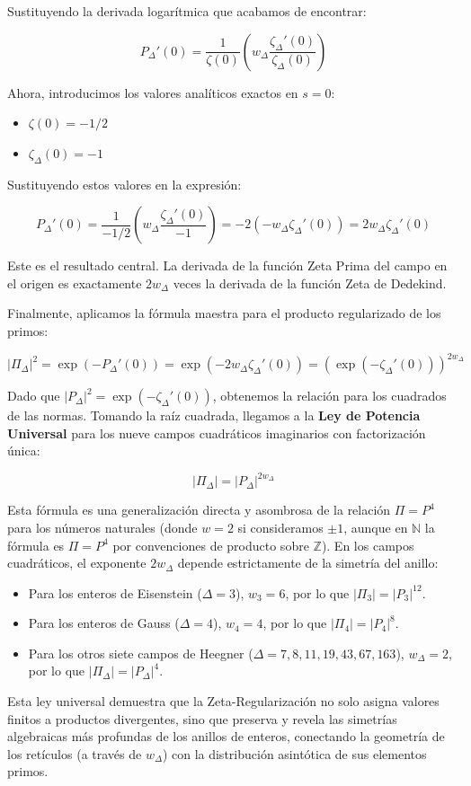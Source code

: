 Sustituyendo la derivada logarítmica que acabamos de encontrar:

$$ P_\Delta'(0) = \frac{1}{\zeta(0)} \left( w_\Delta \frac{\zeta_\Delta'(0)}{\zeta_\Delta(0)} \right) $$

Ahora, introducimos los valores analíticos exactos en $s=0$:
\begin{itemize}
    \item $\zeta(0) = -1/2$
    \item $\zeta_\Delta(0) = -1$
\end{itemize}

Sustituyendo estos valores en la expresión:

$$ P_\Delta'(0) = \frac{1}{-1/2} \left( w_\Delta \frac{\zeta_\Delta'(0)}{-1} \right) = -2 \left( -w_\Delta \zeta_\Delta'(0) \right) = 2w_\Delta \zeta_\Delta'(0) $$

Este es el resultado central. La derivada de la función Zeta Prima del campo en el origen es exactamente $2w_\Delta$ veces la derivada de la función Zeta de Dedekind. 

Finalmente, aplicamos la fórmula maestra para el producto regularizado de los primos:

$$ |\Pi_\Delta|^2 = \exp(-P_\Delta'(0)) = \exp(-2w_\Delta \zeta_\Delta'(0)) = \left( \exp(-\zeta_\Delta'(0)) \right)^{2w_\Delta} $$

Dado que $|P_\Delta|^2 = \exp(-\zeta_\Delta'(0))$, obtenemos la relación para los cuadrados de las normas. Tomando la raíz cuadrada, llegamos a la \textbf{Ley de Potencia Universal} para los nueve campos cuadráticos imaginarios con factorización única:

$$ |\Pi_\Delta| = |P_\Delta|^{2w_\Delta} $$

Esta fórmula es una generalización directa y asombrosa de la relación $\Pi = P^4$ para los números naturales (donde $w=2$ si consideramos $\pm 1$, aunque en $\mathbb{N}$ la fórmula es $\Pi = P^4$ por convenciones de producto sobre $\mathbb{Z}$). En los campos cuadráticos, el exponente $2w_\Delta$ depende estrictamente de la simetría del anillo:
\begin{itemize}
    \item Para los enteros de Eisenstein ($\Delta = 3$), $w_3 = 6$, por lo que $|\Pi_3| = |P_3|^{12}$.
    \item Para los enteros de Gauss ($\Delta = 4$), $w_4 = 4$, por lo que $|\Pi_4| = |P_4|^8$.
    \item Para los otros siete campos de Heegner ($\Delta = 7, 8, 11, 19, 43, 67, 163$), $w_\Delta = 2$, por lo que $|\Pi_\Delta| = |P_\Delta|^4$.
\end{itemize}

Esta ley universal demuestra que la Zeta-Regularización no solo asigna valores finitos a productos divergentes, sino que preserva y revela las simetrías algebraicas más profundas de los anillos de enteros, conectando la geometría de los retículos (a través de $w_\Delta$) con la distribución asintótica de sus elementos primos.

